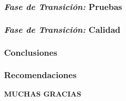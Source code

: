 \documentclass[xcolor=dvipsnames]{beamer}
\begin{document}
\begin{frame}
    \frametitle{\textit{Fase de Transición:} Pruebas}
\end{frame}

\begin{frame}
    \frametitle{\textit{Fase de Transición:} Calidad}
\end{frame}

\begin{frame}
    \frametitle{Conclusiones}
\end{frame}

\begin{frame}
    \frametitle{Recomendaciones}
\end{frame}

\begin{frame}
    \centering\textbf{\huge{\textcolor{color1}{MUCHAS GRACIAS}}}    
\end{frame}
\end{document}

